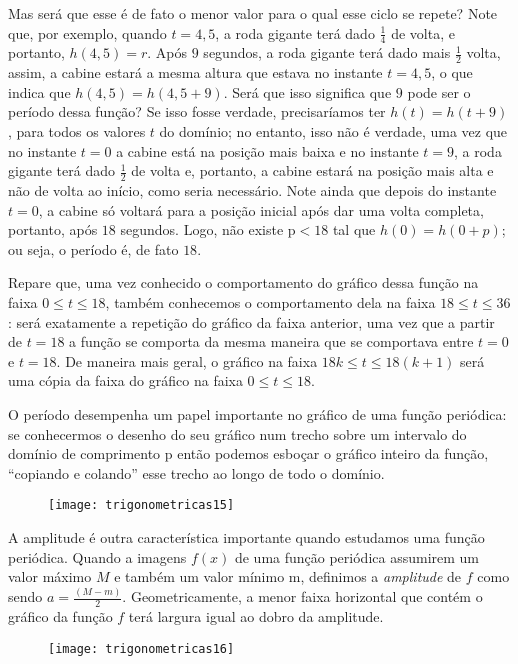 Mas será que esse é de fato o menor valor para o qual esse ciclo se repete? Note que, por exemplo, quando $t=4{,}5$, a roda gigante terá dado $\frac{1}{4}$	de volta, e portanto, $h(4{,}5)=r$. Após $9$ segundos, a roda gigante terá dado mais $\frac{1}{2}$ volta, assim, a cabine estará a mesma altura que estava no instante $t=4{,}5$, o que indica que $h(4{,}5)=h(4{,}5+9)$. Será que isso significa que $9$ pode ser o período dessa função? Se isso fosse verdade, precisaríamos ter $h(t)=h(t+9)$, para todos os valores $t$ do domínio; no entanto, isso não é verdade, uma vez que no instante $t=0$ a cabine está na posição mais baixa e no instante $t=9$, a roda gigante terá dado $\frac{1}{2}$ de volta e, portanto, a cabine estará na posição mais alta e não de volta ao início, como seria necessário. Note ainda que depois do instante $t=0$, a cabine só voltará para a posição inicial após dar uma volta completa, portanto, após $18$ segundos. Logo, não existe p$<18$ tal que $h(0)=h(0+p)$; ou seja, o período é, de fato $18$.

Repare que, uma vez conhecido o comportamento do gráfico dessa função na faixa $0\leq t\leq18$, também conhecemos o comportamento dela na faixa $18\leq t\leq 36$: será exatamente a repetição do gráfico da faixa anterior, uma vez que a partir de $t=18$ a função se comporta da mesma maneira que se comportava entre $t=0$ e $t=18$. De maneira mais geral, o gráfico na faixa $18k\leq t\leq 18(k+1)$ será uma cópia da faixa do gráfico na faixa $0\leq t\leq 18$.

O período desempenha um papel importante no gráfico de uma função periódica: se conhecermos o desenho do seu gráfico num trecho sobre um intervalo do domínio de comprimento p então podemos esboçar o gráfico inteiro da função, “copiando e colando”{} esse trecho ao longo de todo o domínio.

\begin{figure}[H]
\centering

\texttt{[image: trigonometricas15]}
\end{figure}

A amplitude é outra característica importante quando estudamos uma função periódica. Quando a imagens $f(x)$ de uma função periódica assumirem um valor máximo $M$ e também um valor mínimo m, definimos a \textit{amplitude} de $f$ como sendo $a=\frac{(M-m)}{2}$. Geometricamente, a menor faixa horizontal que contém o gráfico da função $f$ terá largura igual ao dobro da amplitude.

\begin{figure}[H]
\centering

\texttt{[image: trigonometricas16]}
\end{figure}

